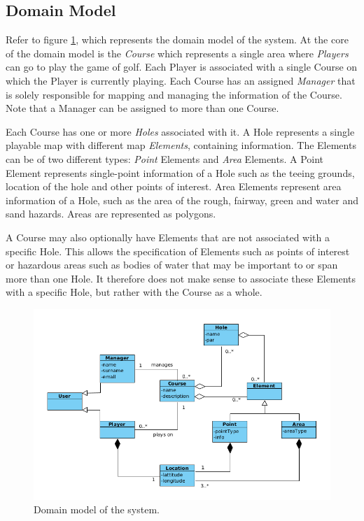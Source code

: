 \documentclass{article}
\begin{document}
    \subsection{Domain Model}

    Refer to figure \ref{fig:domainmodel}, which represents the domain model of
    the system. At the core of the domain model is the \textit{Course} which
    represents a single area where \textit{Players} can go to play the game of
    golf. Each Player is associated with a single Course on which the Player is
    currently playing. Each Course has an assigned \textit{Manager} that is
    solely responsible for mapping and managing the information of the Course.
    Note that a Manager can be assigned to more than one Course.

    Each Course has one or more \textit{Holes} associated with it. A Hole
    represents a single playable map with different map \textit{Elements},
    containing information. The Elements can be of two different types:
    \textit{Point} Elements and \textit{Area} Elements. A Point Element
    represents single-point information of a Hole such as the teeing grounds,
    location of the hole and other points of interest. Area Elements represent
    area information of a Hole, such as the area of the rough, fairway, green
    and water and sand hazards. Areas are represented as polygons.

    A Course may also optionally have Elements that are not associated with a
    specific Hole. This allows the specification of Elements such as points of
    interest or hazardous areas such as bodies of water that may be important
    to or span more than one Hole. It therefore does not make sense to
    associate these Elements with a specific Hole, but rather with the Course
    as a whole.
    
    \begin{figure}[H]
    	\centering
    	\includegraphics[scale=0.5]{DomainModel}
        \caption{Domain model of the system.}
        \label{fig:domainmodel}
    \end{figure}
\end{document}
